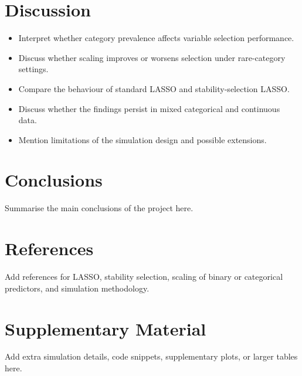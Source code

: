 \documentclass[12pt,a4paper,twoside]{report}
\begin{document}
\chapter{Discussion}

\begin{itemize}
  \item Interpret whether category prevalence affects variable selection performance.
  \item Discuss whether scaling improves or worsens selection under rare-category settings.
  \item Compare the behaviour of standard LASSO and stability-selection LASSO.
  \item Discuss whether the findings persist in mixed categorical and continuous data.
  \item Mention limitations of the simulation design and possible extensions.
\end{itemize}

\chapter{Conclusions}

Summarise the main conclusions of the project here.

\chapter{References}

Add references for LASSO, stability selection, scaling of binary or categorical predictors, and simulation methodology.

% 
% 

\appendix

\chapter{Supplementary Material}

Add extra simulation details, code snippets, supplementary plots, or larger tables here.
\end{document}
